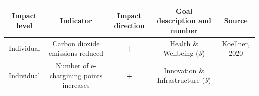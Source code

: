\documentclass[
]{book}
\begin{document}
\begin{longtable}[]{@{}ccccc@{}}
\toprule
\begin{minipage}[b]{0.17\columnwidth}\centering
Impact level\strut
\end{minipage} & \begin{minipage}[b]{0.16\columnwidth}\centering
Indicator\strut
\end{minipage} & \begin{minipage}[b]{0.17\columnwidth}\centering
Impact direction\strut
\end{minipage} & \begin{minipage}[b]{0.17\columnwidth}\centering
Goal description and number\strut
\end{minipage} & \begin{minipage}[b]{0.17\columnwidth}\centering
Source\strut
\end{minipage}\tabularnewline
\midrule
\endhead
\begin{minipage}[t]{0.17\columnwidth}\centering
Individual\strut
\end{minipage} & \begin{minipage}[t]{0.16\columnwidth}\centering
Carbon dioxide emissions reduced\strut
\end{minipage} & \begin{minipage}[t]{0.17\columnwidth}\centering
\textbf{+}\strut
\end{minipage} & \begin{minipage}[t]{0.17\columnwidth}\centering
Health \& Wellbeing (\emph{3})\strut
\end{minipage} & \begin{minipage}[t]{0.17\columnwidth}\centering
Koellner, 2020\strut
\end{minipage}\tabularnewline
\begin{minipage}[t]{0.17\columnwidth}\centering
Individual\strut
\end{minipage} & \begin{minipage}[t]{0.16\columnwidth}\centering
Number of e-chargining points increases\strut
\end{minipage} & \begin{minipage}[t]{0.17\columnwidth}\centering
\textbf{+}\strut
\end{minipage} & \begin{minipage}[t]{0.17\columnwidth}\centering
Innovation \& Infrastructure (\emph{9})\strut
\end{minipage} & \begin{minipage}[t]{0.17\columnwidth}\centering

\end{minipage}
\end{longtable}
\end{document}
